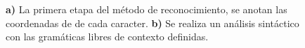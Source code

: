 \begin{figure}[h]
    \centering
    \caption{\textbf{a)} La primera etapa del método de reconocimiento, se anotan las coordenadas de de cada caracter. \textbf{b)} Se realiza un análisis sintáctico con las gramáticas libres de contexto definidas.}
    \label{fig:gramaticas}
\end{figure}

\newpage
